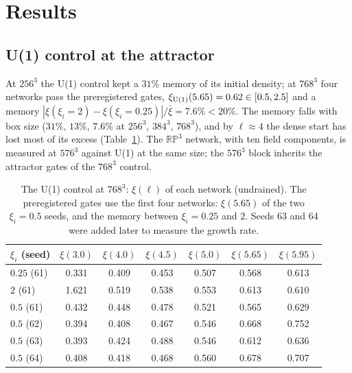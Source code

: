 \documentclass[prd,twocolumn,superscriptaddress,nofootinbib,amsmath,amssymb]{revtex4-2}
\newcommand{\RP}{\mathbb{RP}^3}
\begin{document}
\section{Results}
\label{sec:results}

\subsection{U(1) control at the attractor}

At $256^3$ the U(1) control kept a $31\%$ memory of its initial density; at $768^3$ four networks pass the preregistered gates, $\xi_{\rm U(1)}(5.65)=0.62\in[0.5,2.5]$ and a memory $|\xi(\xi_i{=}2)-\xi(\xi_i{=}0.25)|/\bar\xi=7.6\%<20\%$.
The memory falls with box size ($31\%$, $13\%$, $7.6\%$ at $256^3$, $384^3$, $768^3$), and by $\ell\approx4$ the dense start has lost most of its excess (Table~\ref{tab:u1}).
The $\RP$ network, with ten field components, is measured at $576^3$ against U(1) at the same size; the $576^3$ block inherits the attractor gates of the $768^3$ control.

\begin{table}[t]
\caption{The U(1) control at $768^3$: $\xi(\ell)$ of each network (undrained). The preregistered gates use the first four networks: $\xi(5.65)$ of the two $\xi_i=0.5$ seeds, and the memory between $\xi_i=0.25$ and $2$. Seeds 63 and 64 were added later to measure the growth rate.}
\label{tab:u1}
\setlength{\tabcolsep}{3.5pt}
\begin{tabular}{lcccccc}
\toprule
$\xi_i$ (seed) & $\xi(3.0)$ & $\xi(4.0)$ & $\xi(4.5)$ & $\xi(5.0)$ & $\xi(5.65)$ & $\xi(5.95)$\\
\midrule
$0.25$ (61) & 0.331 & 0.409 & 0.453 & 0.507 & 0.568 & 0.613\\
$2$ (61) & 1.621 & 0.519 & 0.538 & 0.553 & 0.613 & 0.610\\
$0.5$ (61) & 0.432 & 0.448 & 0.478 & 0.521 & 0.565 & 0.629\\
$0.5$ (62) & 0.394 & 0.408 & 0.467 & 0.546 & 0.668 & 0.752\\
$0.5$ (63) & 0.393 & 0.424 & 0.488 & 0.546 & 0.612 & 0.636\\
$0.5$ (64) & 0.408 & 0.418 & 0.468 & 0.560 & 0.678 & 0.707\\
\bottomrule
\end{tabular}
\end{table}
\end{document}
